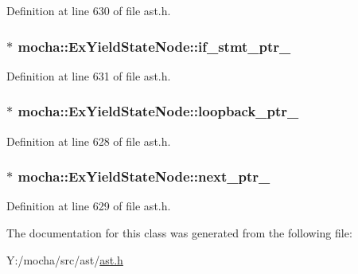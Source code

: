 Definition at line 630 of file ast.h.

\hypertarget{classmocha_1_1_ex_yield_state_node_a9d88b798e715b0285352a756d2cc8338}{
\subsubsection[{if\_\-stmt\_\-ptr\_\-}]{$\ast$ {\bf mocha::ExYieldStateNode::if\_\-stmt\_\-ptr\_\-}}}
\label{classmocha_1_1_ex_yield_state_node_a9d88b798e715b0285352a756d2cc8338}


Definition at line 631 of file ast.h.

\hypertarget{classmocha_1_1_ex_yield_state_node_ae976f2f49a4e1b6db92a6ae343de64be}{
\subsubsection[{loopback\_\-ptr\_\-}]{$\ast$ {\bf mocha::ExYieldStateNode::loopback\_\-ptr\_\-}}}
\label{classmocha_1_1_ex_yield_state_node_ae976f2f49a4e1b6db92a6ae343de64be}


Definition at line 628 of file ast.h.

\hypertarget{classmocha_1_1_ex_yield_state_node_ab8852eda607228274be8c3770d3dd410}{
\subsubsection[{next\_\-ptr\_\-}]{$\ast$ {\bf mocha::ExYieldStateNode::next\_\-ptr\_\-}}}
\label{classmocha_1_1_ex_yield_state_node_ab8852eda607228274be8c3770d3dd410}


Definition at line 629 of file ast.h.



The documentation for this class was generated from the following file:\begin{DoxyCompactItemize}
\item 
Y:/mocha/src/ast/\hyperlink{ast_8h}{ast.h}\end{DoxyCompactItemize}
